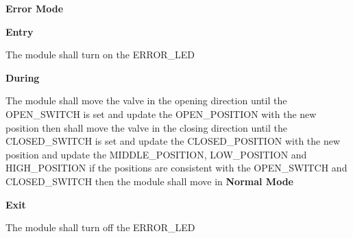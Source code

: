 \begin{req_enum}
\begin{req_enum}[label*=\arabic*.]
					\item \textbf{Error Mode}
						\begin{req_enum}[label*=\arabic*.]
							\item \textbf{Entry}
								\begin{req_enum}[label*=\arabic*.]
									\item The module shall turn on the ERROR\_LED
								\end{req_enum}
							\item \textbf{During}
								\begin{req_enum}[label*=\arabic*.]
									\item The module shall move the valve in the opening direction until the OPEN\_SWITCH is set and update the OPEN\_POSITION with the new position then shall move the valve in the closing direction until the CLOSED\_SWITCH is set and update the CLOSED\_POSITION with the new position and update the MIDDLE\_POSITION, LOW\_POSITION and HIGH\_POSITION if the positions are consistent with the OPEN\_SWITCH and CLOSED\_SWITCH then the module shall move in \textbf{Normal Mode}
								\end{req_enum}

							\item \textbf{Exit}
								\begin{req_enum}[label*=\arabic*.]
									\item The module shall turn off the ERROR\_LED
								\end{req_enum}

						\end{req_enum}
				\end{req_enum}
		\end{req_enum}

